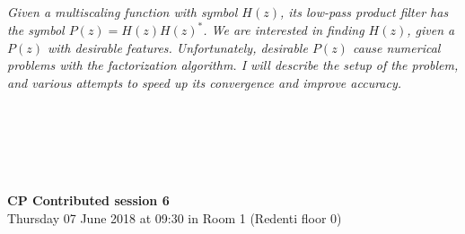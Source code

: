 \begin{multicols}{2}
\\ 
      \\
      \\\\
\\
    \textit{Given a multiscaling function with symbol $H(z)$, its low-pass product
filter has the symbol $P(z) = H(z) H(z)^*$. We are interested in
finding $H(z)$, given a $P(z)$ with desirable features. Unfortunately,
desirable $P(z)$ cause numerical problems with the factorization
algorithm. 
I will describe the setup of the problem, and various attempts to speed up
its convergence and improve accuracy.}\\
\\ 
      \\
      \\\\
\\
  \end{multicols}
  \noindent\textbf{CP Contributed session 6}\\
    Thursday 07 June 2018 at 09:30 in Room 1 (Redenti floor 0)  \\
  \textit{} \\
    
